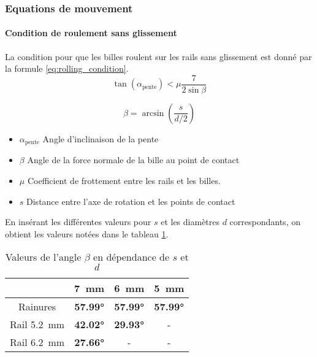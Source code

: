 \subsubsection{Equations de mouvement}

\paragraph{Condition de roulement sans glissement}
La condition pour que les billes roulent sur les rails sans glissement est donné par la formule \ref{eq:rolling_condition}.
\begin{equation}
    \tan(\alpha_{\text{pente}}) < \mu \frac{7}{2\sin{\beta}}
    \label{eq:rolling_condition}
\end{equation}


\[\beta = \arcsin\left(\frac{s}{d/2}\right)\]

\begin{itemize}[label={}, noitemsep]
	\item $\alpha_{\text{pente}}$ \tabto{\tabtoX} Angle d'inclinaison de la pente
	\item $\beta$ \tabto{\tabtoX} Angle de la force normale de la bille au point de contact
	\item $\mu$ \tabto{\tabtoX} Coefficient de frottement entre les rails et les billes.
	\item $s$ \tabto{\tabtoX} Distance entre l'axe de rotation et les points de contact
\end{itemize}

En insérant les différentes valeurs pour $s$ et les diamètres $d$ correspondants, on obtient les valeurs notées dans le tableau \ref{tab:beta_sphere}.

\begin{table}[htbp]
    \centering
    \begin{tabular}{|c|c|c|c|}
        \hline
         & \SI{7}{\mm} & \SI{6}{\mm} & \SI{5}{\mm} \\
        \hline
        Rainures & \textbf{\ang{57.99}} & \textbf{\ang{57.99}} & \textbf{\ang{57.99}} \\
        \hline
        Rail \SI{5.2}{\mm}& \textbf{\ang{42.02}} & \textbf{\ang{29.93}} & - \\
        \hline
        Rail \SI{6.2}{\mm}& \textbf{\ang{27.66}} & - & - \\
        \hline
    \end{tabular}
    \caption{Valeurs de l'angle $\beta$ en dépendance de $s$ et $d$}
    \label{tab:beta_sphere}
\end{table}

